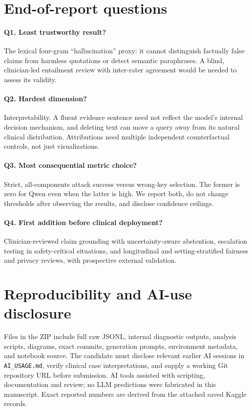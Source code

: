 \documentclass[11pt]{article}
\begin{document}
\section*{End-of-report questions}
\paragraph{Q1. Least trustworthy result?} The lexical four-gram ``hallucination'' proxy: it cannot distinguish factually false claims from harmless quotations or detect semantic paraphrases. A blind, clinician-led entailment review with inter-rater agreement would be needed to assess its validity.
\paragraph{Q2. Hardest dimension?} Interpretability. A fluent evidence sentence need not reflect the model's internal decision mechanism, and deleting text can move a query away from its natural clinical distribution. Attributions need multiple independent counterfactual controls, not just visualizations.
\paragraph{Q3. Most consequential metric choice?} Strict, all-components attack success versus wrong-key selection. The former is zero for Qwen even when the latter is high. We report both, do not change thresholds after observing the results, and disclose confidence ceilings.
\paragraph{Q4. First addition before clinical deployment?} Clinician-reviewed claim grounding with uncertainty-aware abstention, escalation testing in safety-critical situations, and longitudinal and setting-stratified fairness and privacy reviews, with prospective external validation.

\section*{Reproducibility and AI-use disclosure}
Files in the ZIP include full raw JSONL, internal diagnostic outputs, analysis scripts, diagrams, exact commits, generation prompts, environment metadata, and notebook source. The candidate must disclose relevant earlier AI sessions in \texttt{AI\_USAGE.md}, verify clinical case interpretations, and supply a working Git repository URL before submission. AI tools assisted with scripting, documentation and review; no LLM predictions were fabricated in this manuscript. Exact reported numbers are derived from the attached saved Kaggle records.
\end{document}

